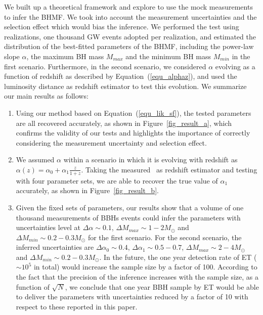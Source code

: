 \documentclass[twocolumn]{aastex62}
\newcommand{\blue}[1]{{#1}}
\begin{document}
We built up a theoretical framework and explore to use the mock measurements to infer the BHMF. We took into account the measurement uncertainties and the selection effect which would bias the inference. We \blue{performed the test using realizations, one thousand GW events adopted per realization}, and estimated the distribution of the best-fitted parameters of the BHMF, including the power-law slope $\alpha$, the maximum BH mass $M_{max}$ and the minimum BH mass $M_{min}$ \blue{in the first scenario}. Furthermore, \blue{in the second scenario, we considered  $\alpha$ evolving as a function of redshift as described by Equation~(\ref{equ_alphaz}), and used the luminosity distance as redshift estimator to test this evolution}. We summarize our main results as follows:
\blue{
\begin{enumerate}
\item Using our method based on Equation~(\ref{equ_lik_sf}), the tested parameters are all recovered accurately, as shown in Figure~\ref{fig_result_a}, which confirms the validity of our tests and highlights the importance of correctly considering the measurement uncertainty and selection effect.
\item We assumed $\alpha$ within a scenario in which it is evolving with redshift as $\alpha(z) = \alpha_0 + \alpha_1\frac{z}{1+z}$. Taking the measured \dl\ as redshift estimator and testing with four parameter sets, we are able to recover the true value of $\alpha_1$ accurately, as shown in Figure~\ref{fig_result_b}.
\item Given the fixed sets of parameters, our results show that a volume of one thousand measurements of BBHs events could infer the parameters with uncertainties level at $\Delta\alpha\sim0.1$, $\Delta M_{max}\sim1-2M_{\odot}$ and $\Delta M_{min}\sim0.2-0.3M_{\odot}$ for the first scenario. For the second scenario, the inferred uncertainties are $\Delta\alpha_0\sim0.4$, $\Delta\alpha_1\sim0.5-0.7$, $\Delta M_{max}\sim2-4M_{\odot}$ and $\Delta M_{min}\sim0.2-0.3M_{\odot}$. In the future, the one year detection rate of ET ($\sim10^5$ in total) would increase the sample size by a factor of 100. According to the fact that the precision of the inference increases with the sample size, as a function of $\sqrt{N}$, we conclude that one year BBH sample by ET would be able to deliver the parameters with uncertainties reduced by a factor of 10 with respect to these reported in this paper.
\end{enumerate}
}
\end{document}
